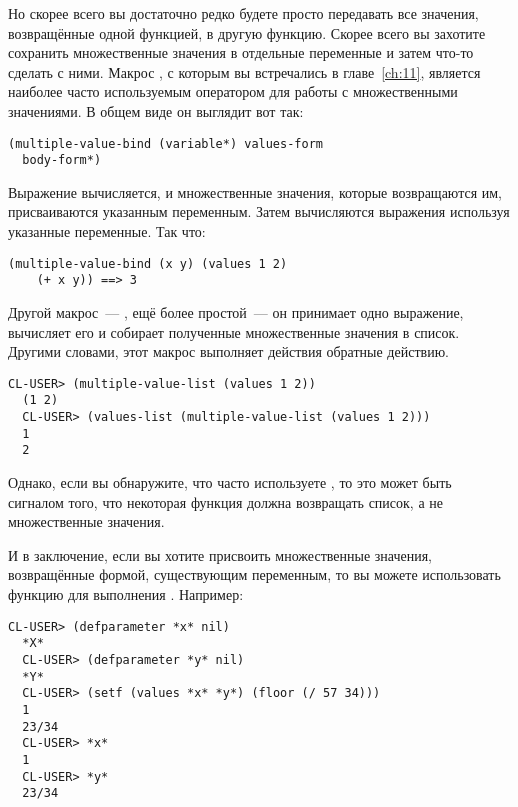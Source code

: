Но скорее всего вы достаточно редко будете просто передавать все значения, возвращённые
одной функцией, в другую функцию.  Скорее всего вы захотите сохранить множественные
значения в отдельные переменные и затем что-то сделать с ними.  Макрос
, с которым вы встречались в главе~\ref{ch:11}, является
наиболее часто используемым оператором для работы с множественными значениями.  В общем
виде он выглядит вот так:

\begin{lstlisting}
(multiple-value-bind (variable*) values-form
  body-form*)
\end{lstlisting}

Выражение  вычисляется, и множественные значения, которые возвращаются
им, присваиваются указанным переменным.  Затем вычисляются выражения 
используя указанные переменные.  Так что:

\begin{lstlisting}[style=lisprepl]
  (multiple-value-bind (x y) (values 1 2)
    (+ x y)) ==> 3
\end{lstlisting}

Другой макрос~--- , ещё более простой~--- он принимает одно
выражение, вычисляет его и собирает полученные множественные значения в список.  Другими
словами, этот макрос выполняет действия обратные действию.

\begin{lstlisting}[style=lisprepl]
  CL-USER> (multiple-value-list (values 1 2))
  (1 2)
  CL-USER> (values-list (multiple-value-list (values 1 2)))
  1
  2
\end{lstlisting}

Однако, если вы обнаружите, что часто используете , то это может
быть сигналом того, что некоторая функция должна возвращать список, а не множественные
значения.

И в заключение, если вы хотите присвоить множественные значения, возвращённые формой,
существующим переменным, то вы можете использовать функцию  для выполнения
.  Например:

\begin{lstlisting}[style=lisprepl]
  CL-USER> (defparameter *x* nil)
  *X*
  CL-USER> (defparameter *y* nil)
  *Y*
  CL-USER> (setf (values *x* *y*) (floor (/ 57 34)))
  1
  23/34
  CL-USER> *x*
  1
  CL-USER> *y*
  23/34
\end{lstlisting}

